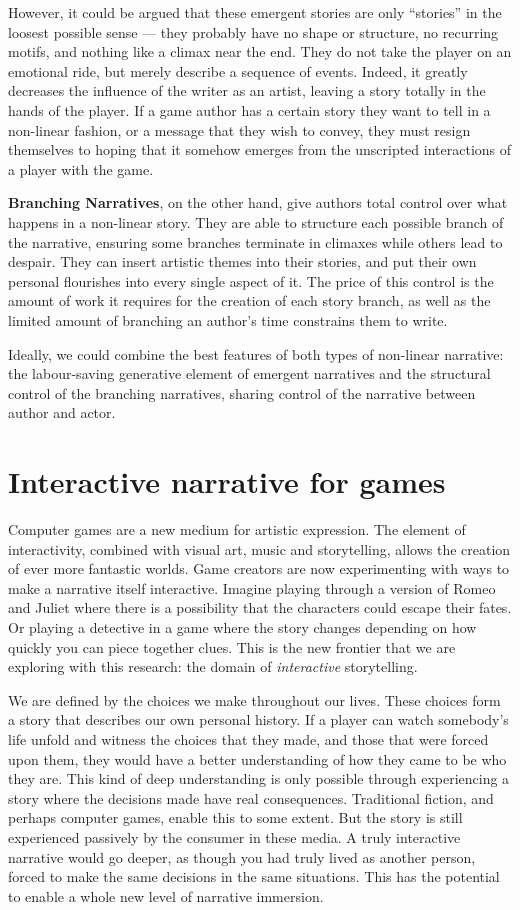 \documentclass[11pt]{report}
\begin{document}
However, it could be argued that these emergent stories are only ``stories'' in
the loosest possible sense --- they probably have no shape or structure, no recurring motifs, and nothing like a climax near the end. They do not take the player on an emotional ride, but merely describe a sequence of events. Indeed, it greatly decreases the influence of the writer as an artist, leaving a story totally in the hands of the player. If a game author has a certain story they want to tell in a non-linear fashion, or a message that they wish to convey, they must resign themselves to hoping that it somehow emerges from the unscripted interactions of a player with the game.

\textbf{Branching Narratives}, on the other hand, give authors total control over what happens in a non-linear story. They are able to structure each possible branch of the narrative, ensuring some branches terminate in climaxes while others lead to despair. They can insert artistic themes into their stories, and put their own personal flourishes into every single aspect of it. The price of this control is the amount of work it requires for the creation of each story branch, as well as the limited amount of branching an author's time constrains them to write.

Ideally, we could combine the best features of both types of non-linear
narrative: the labour-saving generative element of emergent narratives and the
structural control of the branching narratives, sharing control of the narrative
between author and actor.

\section{Interactive narrative for games}
Computer games are a new medium for artistic expression. The element of
interactivity, combined with visual art, music and storytelling, allows the
creation of ever more fantastic worlds. Game creators are now experimenting with
ways to make a narrative itself interactive. Imagine playing through a version
of Romeo and Juliet where there is a possibility that the characters could
escape their fates. Or playing a detective in a game where the story changes
depending on how quickly you can piece together clues. This is the new frontier that we are exploring with this research: the domain of \emph{interactive} storytelling.

We are defined by the choices we make throughout our lives. These choices form a
story that describes our own personal history. If a player can watch somebody's
life unfold and witness the choices that they made, and those that were forced
upon them, they would have a better understanding of how they came to be who they
are. This kind of deep understanding is only possible through experiencing a
story where the decisions made have real consequences. Traditional fiction, and
perhaps computer games, enable this to some extent. But the story is still
experienced passively by the consumer in these media. A truly interactive
narrative would go deeper, as though you had truly lived as another person,
forced to make the same decisions in the same situations. This has the potential
to enable a whole new level of narrative immersion.
\end{document}
